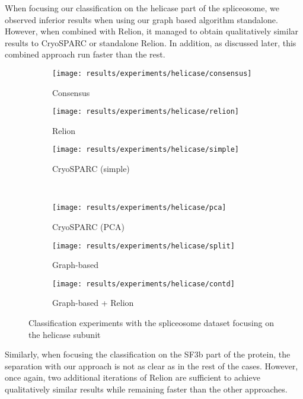 \documentclass[../main.tex]{subfiles}
\begin{document}
When focusing our classification on the helicase part of the spliceosome, we observed inferior results when using our graph based algorithm standalone. However, when combined with Relion, it managed to obtain qualitatively similar results to CryoSPARC or standalone Relion. In addition, as discussed later, this combined approach run faster than the rest. 

\begin{figure}[hbp]
    \centering
    \begin{subfigure}[b]{0.3\textwidth}
         \centering
         \texttt{[image: results/experiments/helicase/consensus]}
         \caption{Consensus}
    \end{subfigure}
    \begin{subfigure}[b]{0.3\textwidth}
         \centering
         \texttt{[image: results/experiments/helicase/relion]}
         \caption{Relion}
    \end{subfigure}
    \begin{subfigure}[b]{0.3\textwidth}
         \centering
         \texttt{[image: results/experiments/helicase/simple]}
         \caption{CryoSPARC (simple)}
    \end{subfigure}\\
    \vspace{1em}
    \begin{subfigure}[b]{0.3\textwidth}
         \centering
         \texttt{[image: results/experiments/helicase/pca]}
         \caption{CryoSPARC (PCA)}
    \end{subfigure}
    \begin{subfigure}[b]{0.3\textwidth}
         \centering
         \texttt{[image: results/experiments/helicase/split]}
         \caption{Graph-based}
    \end{subfigure}
    \begin{subfigure}[b]{0.3\textwidth}
         \centering
         \texttt{[image: results/experiments/helicase/contd]}
         \caption{Graph-based + Relion}
    \end{subfigure}
    \caption{Classification experiments with the spliceosome dataset focusing on the helicase subunit}
    \label{fig:5.2:helicase_slices}
\end{figure}

Similarly, when focusing the classification on the SF3b part of the protein, the separation with our approach is not as clear as in the rest of the cases. However, once again, two additional iterations of Relion are sufficient to achieve qualitatively similar results while remaining faster than the other approaches. 
\end{document}
